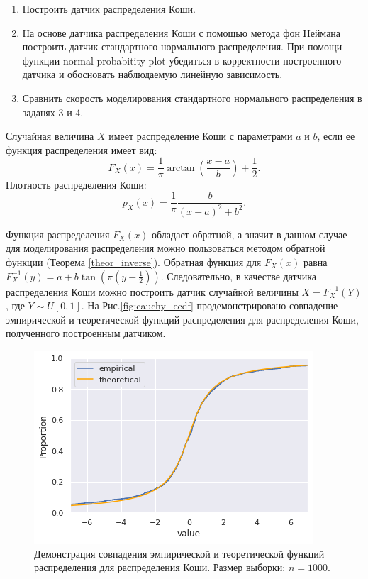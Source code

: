 \begin{enumerate}
\item Построить датчик распределения Коши. 
\item На основе датчика распределения Коши с помощью метода фон Неймана построить
 датчик стандартного нормального распределения. При помощи функции normal
 probabitity plot убедиться в корректности построенного датчика и обосновать
 наблюдаемую линейную зависимость.
\item Сравнить скорость моделирования стандартного нормального распределения в
 заданях 3 и 4.
\end{enumerate}

\begin{definition}
	Случайная величина $X$ имеет распределение Коши с параметрами $a$ и $b$, если
     ее функция распределения имеет вид:
    $$
	F_X(x) = \frac{1}{\pi}\arctan\left(\frac{x - a}{b}\right) + \frac{1}{2}.
	$$
	Плотность распределения Коши:
	$$
	p_X(x) = \frac{1}{\pi}\frac{b}{(x- a)^2 + b^2}.
	$$
\end{definition}

Функция распределения $F_X(x)$ обладает обратной, а значит в данном случае для
 моделирования распределения можно пользоваться методом обратной функции
 (Теорема \eqref{theor_inverse}). Обратная функция для $F_X(x)$ равна $F_X^{-1}(y)
 = a + b\tan\left(\pi\left(y - \frac{1}{2}\right)\right)$. Следовательно,
 в качестве датчика распределения Коши можно построить датчик случайной величины
 $X = F_X^{-1}(Y)$, где $Y \sim U[0, 1]$. На Рис.\eqref{fig:cauchy_ecdf}
 продемонстрировано совпадение эмпирической и теоретической функций распределения
 для распределения Коши, полученного построенным датчиком.

\begin{figure}[ht]
	\centering
	\includegraphics[width = 0.7\linewidth]{"./resources/cauchy_ecdf.png"}
	\caption{Демонстрация совпадения эмпирической и теоретической функций
     распределения для распределения Коши. Размер выборки: $ n = 1000 $.}
    \label{fig:cauchy_ecdf}
\end{figure}

